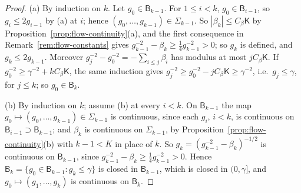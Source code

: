 \begin{proof}
(a) By induction on $k$. Let $g_0\in\mathsf B_{k-1}$. For $1\le i<k$, $g_0\in\mathsf B_{i-1}$, so $g_i\le2g_{i-1}$ by (a) at $i$; hence $(g_0,\dots,g_{k-1})\in\Sigma_{k-1}$. So $|\beta_k|\le C_\beta\mathsf K$ by Proposition~\ref{prop:flow-continuity}(a), and the first consequence in Remark~\ref{rem:flow-constants} gives $g_{k-1}^{-2}-\beta_k\ge\frac14g_{k-1}^{-2}>0$; so $g_k$ is defined, and $g_k\le2g_{k-1}$. Moreover $g_j^{-2}-g_0^{-2}=-\sum_{i\le j}\beta_i$ has modulus at most $jC_\beta\mathsf K$. If $g_0^{-2}\ge\gamma^{-2}+kC_\beta\mathsf K$, the same induction gives $g_j^{-2}\ge g_0^{-2}-jC_\beta\mathsf K\ge\gamma^{-2}$, i.e.\ $g_j\le\gamma$, for $j\le k$; so $g_0\in\mathsf B_k$.

(b) By induction on $k$; assume (b) at every $i<k$. On $\mathsf B_{k-1}$ the map $g_0\mapsto(g_0,\dots,g_{k-1})\in\Sigma_{k-1}$ is continuous, since each $g_i$, $i<k$, is continuous on $\mathsf B_{i-1}\supset\mathsf B_{k-1}$; and $\beta_k$ is continuous on $\Sigma_{k-1}$, by Proposition~\ref{prop:flow-continuity}(b) with $k-1<K$ in place of $k$. So $g_k=(g_{k-1}^{-2}-\beta_k)^{-1/2}$ is continuous on $\mathsf B_{k-1}$, since $g_{k-1}^{-2}-\beta_k\ge\frac14g_{k-1}^{-2}>0$. Hence $\mathsf B_k=\{g_0\in\mathsf B_{k-1}:g_k\le\gamma\}$ is closed in $\mathsf B_{k-1}$, which is closed in $(0,\gamma]$, and $g_0\mapsto(g_1,\dots,g_k)$ is continuous on $\mathsf B_k$.
\end{proof}

